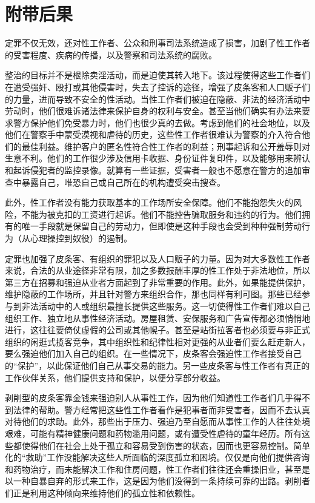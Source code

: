 \documentclass[fontset=fandol, a4paper, 12pt, openright]{ctexbook}
\begin{document}
\section{附带后果}

定罪不仅无效，还对性工作者、公众和刑事司法系统造成了损害，加剧了性工作者的受害程度、疾病的传播，以及警察和司法系统的腐败。

整治的目标并不是根除卖淫活动，而是迫使其转入地下。该过程使得这些工作者们在遭受强奸、殴打或其他侵害时，失去了控诉的途径，增强了皮条客和人口贩子们的力量，进而导致不安全的性活动。当性工作者们被迫在隐蔽、非法的经济活动中劳动时，他们很难诉诸法律来保护自身的权利与安全。甚至当他们确实有办法来要求警方保护他们免受暴力时，他们也很少真的去做。考虑到他们的社会地位，以及他们在警察手中蒙受漠视和虐待的历史，这些性工作者很难认为警察的介入符合他们的最佳利益。维护客户的匿名性符合性工作者的利益；刑事起诉和公开羞辱则对生意不利。他们的工作很少涉及信用卡收据、身份证件复印件，以及能够用来辨认和起诉侵犯者的监控录像。就算有一些证据，受害者一般也不愿意在警方的追加审查中暴露自己，唯恐自己或自己所在的机构遭受突击搜查。

此外，性工作者没有能力获取基本的工作场所安全保障。他们不能抱怨失火的风险，不能为被克扣的工资进行起诉。他们不能控告骗取服务和违约的行为。他们拥有的唯一手段就是保留自己的劳动力，但即使是这种手段也会受到种种强制劳动行为（从心理操控到奴役）的遏制。

定罪也加强了皮条客、有组织的罪犯以及人口贩子的力量。因为对大多数性工作者来说，合法的从业途径非常有限，加之多数报酬丰厚的性工作处于非法地位，所以第三方在招募和强迫从业者方面起到了非常重要的作用。此外，如果能提供保护，维护隐蔽的工作场所，并且针对警方来组织合作，那也同样有利可图。那些已经参与到非法活动中的人或组织最擅长提供这些服务。这一切使得性工作者们难以自己组织工作、独立地从事性经济活动。房屋租赁、安保服务和广告宣传都必须悄悄地进行，这往往要倚仗虚假的公司或其他幌子。甚至是站街拉客者也必须要与非正式组织的闲逛式揽客竞争，其中组织性和纪律性相对更强的从业者们要么赶走新人，要么强迫他们加入自己的组织。在一些情况下，皮条客会强迫性工作者接受自己的“保护”，以此保证他们自己从事交易的能力。另一些皮条客与性工作者有真正的工作伙伴关系，他们提供支持和保护，以便分享部分收益。

剥削型的皮条客靠金钱来强迫别人从事性工作，因为他们知道性工作者们几乎得不到法律的帮助。警方经常把这些性工作者看作是犯事者而非受害者，因而不去认真对待他们的求助。此外，那些出于压力、强迫乃至自愿而从事性工作的人往往处境艰难，可能有精神健康问题和药物滥用问题，或有遭受性虐待的童年经历。所有这些都使得他们在社会上处于孤立和容易受到伤害的状态，因而也更容易控制。简单化的“救助”工作没能解决这些人所面临的深度孤立和困境。仅仅是向他们提供咨询和药物治疗，而未能解决工作和住房问题，性工作者们往往还会重操旧业，甚至是以一种自暴自弃的形式来工作，这是因为他们没得到一条持续可靠的出路。剥削者们正是利用这种倾向来维持他们的孤立性和依赖性。
\end{document}
